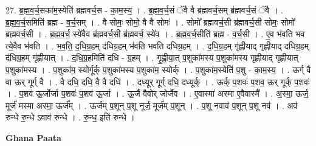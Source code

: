 \documentclass[17pt]{extarticle}
\begin{document}
27. ब्र॒ह्म॒व॒र्च॒सका॑म॒स्येति॑ ब्रह्मवर्च॒स - का॒म॒स्य॒ । . ब्र॒ह्म॒व॒र्च॒सं ॅवै वै ब्र॑ह्मवर्च॒सम् ब्र॑ह्मवर्च॒सं ॅवै । . ब्र॒ह्म॒व॒र्च॒समिति॑ ब्रह्म - व॒र्च॒सम् । . वै सोमः॒ सोमो॒ वै वै सोमः॑ । . सोमो᳚ ब्रह्मवर्च॒सी ब्र॑ह्मवर्च॒सी सोमः॒ सोमो᳚ ब्रह्मवर्च॒सी । . ब्र॒ह्म॒व॒र्च॒ स्ये॑वैव ब्र॑ह्मवर्च॒सी ब्र॑ह्मवर्च॒ स्ये॑व । . ब्र॒ह्म॒व॒र्च॒सीति॑ ब्रह्म - व॒र्च॒सी । . ए॒व भ॑वति भव त्ये॒वैव भ॑वति । . भ॒व॒ति॒ द॒धि॒ग्र॒हम् द॑धिग्र॒हम् भ॑वति भवति दधिग्र॒हम् । . द॒धि॒ग्र॒हम् गृ॑ह्णीयाद् गृह्णीयाद् दधिग्र॒हम् द॑धिग्र॒हम् गृ॑ह्णीयात् । . द॒धि॒ग्र॒हमिति॑ दधि - ग्र॒हम् । . गृ॒ह्णी॒या॒त् प॒शुका॑मस्य प॒शुका॑मस्य गृह्णीयाद् गृह्णीयात् प॒शुका॑मस्य । . प॒शुका॑म॒ स्योर्गूर्क् प॒शुका॑मस्य प॒शुका॑म॒ स्योर्क् । . प॒शुका॑म॒स्येति॑ प॒शु - का॒म॒स्य॒ । . ऊर्ग् वै वा ऊर् गूर्ग् वै । . वै दधि॒ दधि॒ वै वै दधि॑ । . दध्यूर् गूर्ग् दधि॒ दध्यूर्क् । . ऊर्क् प॒शवः॑ प॒शव॒ ऊर् गूर्क् प॒शवः॑ । . प॒शव॑ ऊ॒र्जोर्जा प॒शवः॑ प॒शव॑ ऊ॒र्जा । . ऊ॒र्जै वैवोर् जोर्जैव । . ए॒वास्मा॑ अस्मा ए॒वैवास्मै᳚ । . अ॒स्मा॒ ऊर्ज॒ मूर्ज॑ मस्मा अस्मा॒ ऊर्ज᳚म् । . ऊर्ज॑म् प॒शून् प॒शू नूर्ज॒ मूर्ज॑म् प॒शून् । . प॒शू नवाव॑ प॒शून् प॒शू नव॑ । . अव॑ रुन्धे रु॒न्धे ऽवाव॑ रुन्धे । . रु॒न्ध॒ इति॑ रुन्धे । \newline

\textbf{Ghana Paata } \newline
\end{document}
